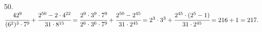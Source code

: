 50. $\cfrac{42^9}{(6^2)^3\cdot7^9}+\cfrac{2^{50}-2\cdot4^{22}}{31\cdot8^{15}}=\cfrac{2^9\cdot3^9\cdot7^9}{2^6\cdot3^6\cdot7^9}+\cfrac{2^{50}-2^{45}}{31\cdot2^{45}}=
2^3\cdot3^3+\cfrac{2^{45}\cdot(2^5-1)}{31\cdot2^{45}}=216+1=217.$\\
